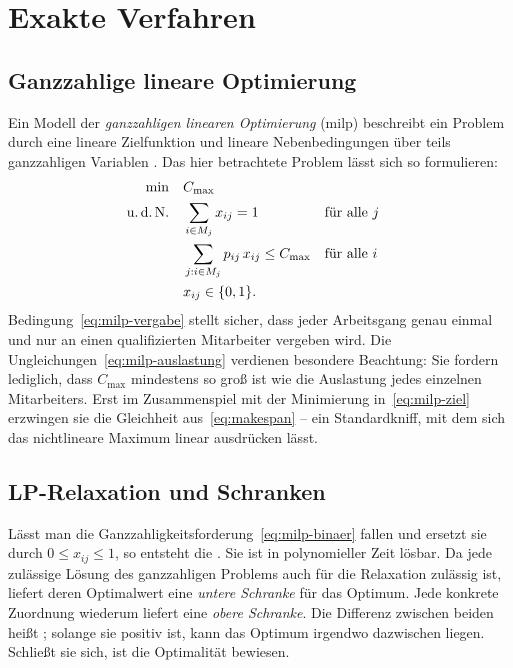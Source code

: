 \section{Exakte Verfahren}
\label{sec:exakt}

\subsection{Ganzzahlige lineare Optimierung}

Ein Modell der \emph{ganzzahligen linearen
Optimierung} (\ac{milp}) beschreibt ein Problem durch eine lineare Zielfunktion
und lineare Nebenbedingungen über teils ganzzahligen Variablen
\parencite{wolsey2020integer}. Das hier betrachtete Problem lässt sich so
formulieren:
\begin{align}
  \min \quad & C_{\max} \label{eq:milp-ziel}\\
  \text{u.\,d.\,N.} \quad & \sum_{i \in M_j} x_{ij} = 1 && \text{für alle } j \label{eq:milp-vergabe}\\
  & \sum_{j : i \in M_j} p_{ij}\, x_{ij} \le C_{\max} && \text{für alle } i \label{eq:milp-auslastung}\\
  & x_{ij} \in \{0,1\}. \label{eq:milp-binaer}
\end{align}
Bedingung~\eqref{eq:milp-vergabe} stellt sicher, dass jeder Arbeitsgang genau
einmal und nur an einen qualifizierten Mitarbeiter vergeben wird. Die
Ungleichungen~\eqref{eq:milp-auslastung} verdienen besondere Beachtung: Sie
fordern lediglich, dass $C_{\max}$ mindestens so groß ist wie die Auslastung
jedes einzelnen Mitarbeiters. Erst im Zusammenspiel mit der Minimierung
in~\eqref{eq:milp-ziel} erzwingen sie die Gleichheit aus~\eqref{eq:makespan} --
ein Standardkniff, mit dem sich das nichtlineare Maximum linear ausdrücken
lässt.

\subsection{LP-Relaxation und Schranken}

Lässt man die Ganzzahligkeitsforderung~\eqref{eq:milp-binaer} fallen und
ersetzt sie durch $0 \le x_{ij} \le 1$, so entsteht die .
Sie ist in polynomieller Zeit lösbar. Da jede zulässige Lösung des
ganzzahligen Problems auch für die Relaxation zulässig ist, liefert deren
Optimalwert eine \emph{untere Schranke} für das Optimum. Jede
konkrete Zuordnung wiederum liefert eine \emph{obere Schranke}.
Die Differenz zwischen beiden heißt ; solange sie
positiv ist, kann das Optimum irgendwo dazwischen liegen. Schließt sie sich, ist
die Optimalität bewiesen.

